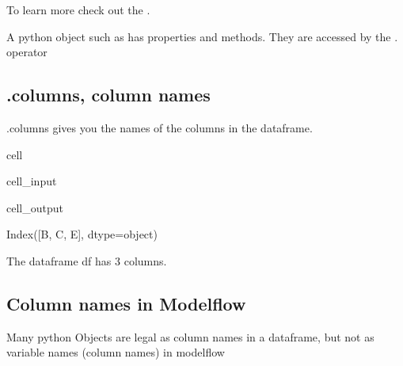 \documentclass[letterpaper,10pt,english]{jupyterBook}
\begin{document}
\sphinxAtStartPar
To learn more check out the .

\begin{sphinxShadowBox}

\sphinxAtStartPar
A python object such as  has properties and methods.
They are accessed by the . operator
\end{sphinxShadowBox}


\subsection{.columns, column names}
\label{\detokenize{content/notebooks/pandas/dataframes:columns-column-names}}
\sphinxAtStartPar
.columns gives you the names of the columns in the dataframe.

\begin{sphinxuseclass}{cell}\begin{sphinxVerbatimInput}

\begin{sphinxuseclass}{cell_input}
\begin{sphinxVerbatim}[commandchars=\\\{\}]
\end{sphinxVerbatim}

\end{sphinxuseclass}\end{sphinxVerbatimInput}
\begin{sphinxVerbatimOutput}

\begin{sphinxuseclass}{cell_output}
\begin{sphinxVerbatim}[commandchars=\\\{\}]
Index([\PYGZsq{}B\PYGZsq{}, \PYGZsq{}C\PYGZsq{}, \PYGZsq{}E\PYGZsq{}], dtype=\PYGZsq{}object\PYGZsq{})
\end{sphinxVerbatim}

\end{sphinxuseclass}\end{sphinxVerbatimOutput}

\end{sphinxuseclass}
\sphinxAtStartPar
The dataframe df has 3 columns.


\subsection{Column names in  Modelflow}
\label{\detokenize{content/notebooks/pandas/dataframes:column-names-in-modelflow}}
\begin{sphinxShadowBox}

\sphinxAtStartPar
Many python Objects are legal as column names in a dataframe, but not as variable names (column names)  in modelflow
\end{sphinxShadowBox}
\end{document}
